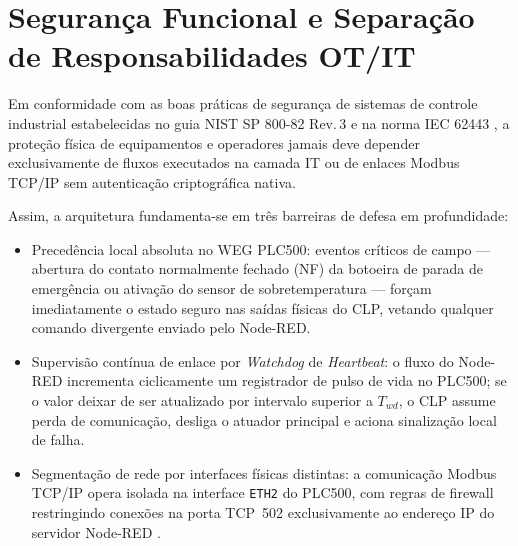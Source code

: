 \section{Segurança Funcional e Separação de Responsabilidades OT/IT}
\label{sec:fund_seguranca}

Em conformidade com as boas práticas de segurança de sistemas de controle industrial estabelecidas no guia NIST SP 800-82 Rev.\,3 \cite{stouffer_nist_ot} e na norma IEC 62443 \cite{iec_62443}, a proteção física de equipamentos e operadores jamais deve depender exclusivamente de fluxos executados na camada IT ou de enlaces Modbus TCP/IP sem autenticação criptográfica nativa.

Assim, a arquitetura fundamenta-se em três barreiras de defesa em profundidade:
\begin{itemize}
  \item Precedência local absoluta no WEG PLC500: eventos críticos de campo --- abertura do contato normalmente fechado (NF) da botoeira de parada de emergência ou ativação do sensor de sobretemperatura --- forçam imediatamente o estado seguro nas saídas físicas do CLP, vetando qualquer comando divergente enviado pelo Node-RED.
  \item Supervisão contínua de enlace por \textit{Watchdog} de \textit{Heartbeat}: o fluxo do Node-RED incrementa ciclicamente um registrador de pulso de vida no PLC500; se o valor deixar de ser atualizado por intervalo superior a $T_{wd}$, o CLP assume perda de comunicação, desliga o atuador principal e aciona sinalização local de falha.
  \item Segmentação de rede por interfaces físicas distintas: a comunicação Modbus TCP/IP opera isolada na interface \texttt{ETH2} do PLC500, com regras de firewall restringindo conexões na porta TCP~502 exclusivamente ao endereço IP do servidor Node-RED \cite{stouffer_nist_ot}.
\end{itemize}

